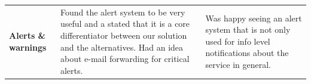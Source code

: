 \documentclass{imc-inf}
\begin{document}
\begin{longtable}{@{}>{\raggedright\arraybackslash}p{3cm}p{5.75cm}p{5.75cm}@{}}
  \textbf{Alerts \& warnings}                                                                                                                                                                                                                                                                                                                                                                                                                                                                                                                                                                                                                                                                                                                                                                                                                                                                                  &
  Found the alert system to be very useful and a stated that it is a core differentiator between our solution and the alternatives. Had an idea about e-mail forwarding for critical alerts.                                                                                                                                                                                                                                                                                                                                                                                                                                                                                                                                                                                                                                                                                                                   &
  Was happy seeing an alert system that is not only used for info level notifications about the service in general.                                                                                                                                                                                                                                                                                                                                                                                                                                                                                                                                                                                                                                                                                                                                                                                                                                        \\[6pt]


\end{longtable}
\end{document}
